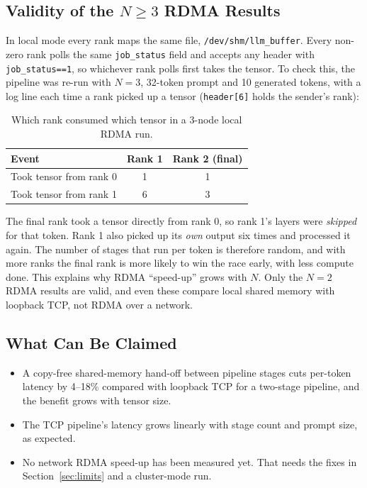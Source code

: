 \documentclass[11pt,a4paper]{article}
\begin{document}
\subsection{Validity of the $N \ge 3$ RDMA Results}
\label{sec:validity}
In local mode every rank maps the same file, \texttt{/dev/shm/llm\_buffer}. Every non-zero rank polls the same \texttt{job\_status} field and accepts any header with \texttt{job\_status==1}, so whichever rank polls first takes the tensor. To check this, the pipeline was re-run with $N=3$, 32-token prompt and 10 generated tokens, with a log line each time a rank picked up a tensor (\texttt{header[6]} holds the sender's rank):

\begin{table}[h]
\centering
\small
\begin{tabular}{@{}lcc@{}}
\toprule
Event & Rank 1 & Rank 2 (final) \\
\midrule
Took tensor from rank 0 & 1 & 1 \\
Took tensor from rank 1 & 6 & 3 \\
\bottomrule
\end{tabular}
\caption{Which rank consumed which tensor in a 3-node local RDMA run.}
\end{table}

The final rank took a tensor directly from rank 0, so rank 1's layers were \emph{skipped} for that token. Rank 1 also picked up its \emph{own} output six times and processed it again. The number of stages that run per token is therefore random, and with more ranks the final rank is more likely to win the race early, with less compute done. This explains why RDMA ``speed-up'' grows with $N$. Only the $N=2$ RDMA results are valid, and even these compare local shared memory with loopback TCP, not RDMA over a network.

\subsection{What Can Be Claimed}
\begin{itemize}[leftmargin=*]
  \item A copy-free shared-memory hand-off between pipeline stages cuts per-token latency by 4--18\% compared with loopback TCP for a two-stage pipeline, and the benefit grows with tensor size.
  \item The TCP pipeline's latency grows linearly with stage count and prompt size, as expected.
  \item No network RDMA speed-up has been measured yet. That needs the fixes in Section~\ref{sec:limits} and a cluster-mode run.
\end{itemize}
\end{document}
